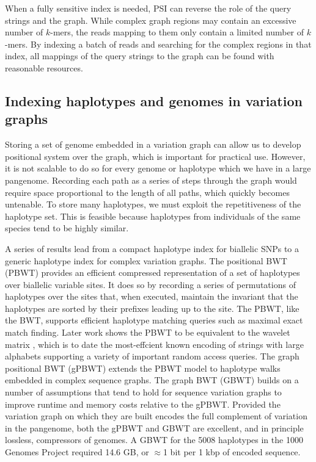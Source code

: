 When a fully sensitive index is needed, PSI can reverse the role of the query strings and the graph.
While complex graph regions may contain an excessive number of $k$-mers, the reads mapping to them only contain a limited number of $k$-mers.
By indexing a batch of reads and searching for the complex regions in that index, all mappings of the query strings to the graph can be found with reasonable resources.

\subsection{Indexing haplotypes and genomes in variation graphs}

Storing a set of genome embedded in a variation graph can allow us to develop positional system over the graph, which is important for practical use.
However, it is not scalable to do so for every genome or haplotype which we have in a large pangenome.
Recording each path as a series of steps through the graph would require space proportional to the length of all paths, which quickly becomes untenable.
To store many haplotypes, we must exploit the repetitiveness of the haplotype set.
This is feasible because haplotypes from individuals of the same species tend to be highly similar.

A series of results lead from a compact haplotype index for biallelic SNPs to a generic haplotype index for complex variation graphs.
The positional BWT (PBWT) \cite{Durbin_2014} provides an efficient compressed representation of a set of haplotypes over biallelic variable sites.
It does so by recording a series of permutations of haplotypes over the sites that, when executed, maintain the invariant that the haplotypes are sorted by their prefixes leading up to the site.
The PBWT, like the BWT, supports efficient haplotype matching queries such as maximal exact match finding.
Later work \cite{Gagie_2017} shows the PBWT to be equivalent to the wavelet matrix \cite{Claude_2015}, which is to date the most-effcient known encoding of strings with large alphabets supporting a variety of important random access queries.
The graph positional BWT (gPBWT) \cite{Novak_2017} extends the PBWT model to haplotype walks embedded in complex sequence graphs.
The graph BWT (GBWT) \cite{siren2018haplotype} builds on a number of assumptions that tend to hold for sequence variation graphs to improve runtime and memory costs relative to the gPBWT.
Provided the variation graph on which they are built encodes the full complement of variation in the pangenome, both the gPBWT and GBWT are excellent, and in principle lossless, compressors of genomes.
A GBWT for the 5008 haplotypes in the 1000 Genomes Project required 14.6 GB, or $\approx$1 bit per 1 kbp of encoded sequence.



